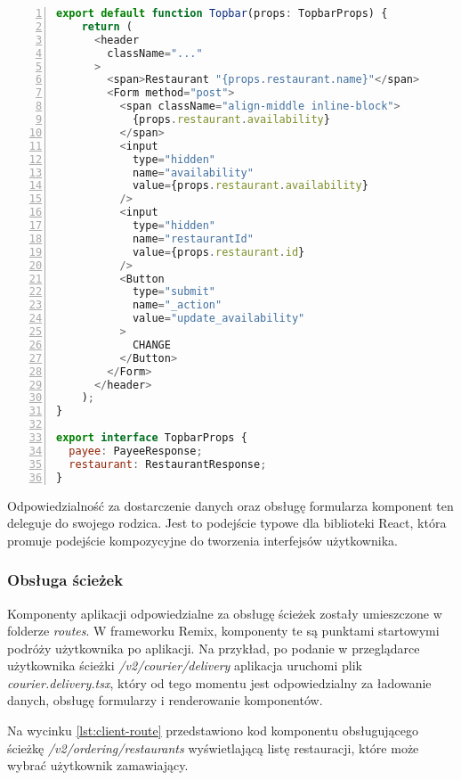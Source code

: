 \begin{lstlisting}[caption={Kod komponentu interfejsu użytkownika - pasek nawigacji managera restauracji},label={lst:client-component},captionpos=b,language=JavaScript,numbers=left,showstringspaces=false]
export default function Topbar(props: TopbarProps) {
    return (
      <header
        className="..."
      >
        <span>Restaurant "{props.restaurant.name}"</span>
        <Form method="post">
          <span className="align-middle inline-block">
            {props.restaurant.availability}
          </span>
          <input
            type="hidden"
            name="availability"
            value={props.restaurant.availability}
          />
          <input
            type="hidden"
            name="restaurantId"
            value={props.restaurant.id}
          />
          <Button 
            type="submit" 
            name="_action" 
            value="update_availability"
          >
            CHANGE
          </Button>
        </Form>
      </header>
    );
}
  
export interface TopbarProps {
  payee: PayeeResponse;
  restaurant: RestaurantResponse;
}
\end{lstlisting}

Odpowiedzialność za dostarczenie danych oraz obsługę formularza komponent ten deleguje do swojego rodzica. Jest to podejście typowe dla biblioteki React, która promuje podejście kompozycyjne do tworzenia interfejsów użytkownika.

\subsubsection{Obsługa ścieżek}

Komponenty aplikacji odpowiedzialne za obsługę ścieżek zostały umieszczone w folderze \textit{routes}. W frameworku Remix, komponenty te są punktami startowymi podróży użytkownika po aplikacji. Na przykład, po podanie w przeglądarce użytkownika ścieżki \textit{/v2/courier/delivery} aplikacja uruchomi plik \textit{courier.delivery.tsx}, który od tego momentu jest odpowiedzialny za ładowanie danych, obsługę formularzy i renderowanie komponentów.

Na wycinku \ref{lst:client-route} przedstawiono kod komponentu obsługującego ścieżkę \textit{/v2/ordering/restaurants} wyświetlającą listę restauracji, które może wybrać użytkownik zamawiający.

